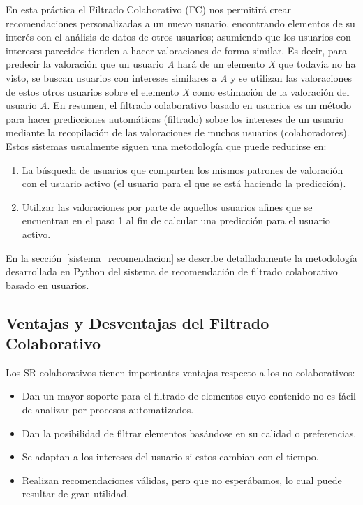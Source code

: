\documentclass{uimppracticas}
\begin{document}
En esta práctica el Filtrado Colaborativo (FC) nos permitirá crear recomendaciones personalizadas a un nuevo usuario, encontrando elementos de su interés con el análisis de datos de otros usuarios; asumiendo que los usuarios con intereses parecidos tienden a hacer valoraciones de forma similar. Es decir, para predecir la valoración que un usuario \textit{A} hará de un elemento \textit{X} que todavía no ha visto, se buscan usuarios con intereses similares a \textit{A} y se utilizan las valoraciones de estos otros usuarios sobre el elemento \textit{X} como estimación de la valoración del usuario \textit{A}. En resumen, el filtrado colaborativo basado en usuarios es un método para hacer predicciones automáticas (filtrado) sobre los intereses de un usuario mediante la recopilación de las valoraciones de muchos usuarios (colaboradores). Estos sistemas usualmente siguen una metodología que puede reducirse en:

\begin{enumerate}
	\item La búsqueda de usuarios que comparten los mismos patrones de valoración con el usuario activo (el usuario para el que se está haciendo la predicción).
	\item Utilizar las valoraciones por parte de aquellos usuarios afines que se encuentran en el paso 1 al fin de calcular una predicción para el usuario activo.
\end{enumerate}

En la sección~\ref{sistema_recomendacion} se describe detalladamente la metodología desarrollada en Python del sistema de recomendación de filtrado colaborativo basado en usuarios.

\subsection{Ventajas y Desventajas del Filtrado Colaborativo}\label{ventajas_desventajas}

Los SR colaborativos tienen importantes ventajas respecto a los no colaborativos:

\begin{itemize}
	\item Dan un mayor soporte para el filtrado de elementos cuyo contenido no es fácil de analizar por procesos automatizados.
	\item Dan la posibilidad de filtrar elementos basándose en su calidad o preferencias.
	\item Se adaptan a los intereses del usuario si estos cambian con el tiempo.
	\item Realizan recomendaciones válidas, pero que no esperábamos, lo cual puede resultar de gran utilidad.
\end{itemize}
\end{document}
